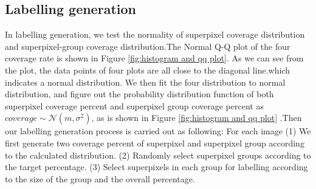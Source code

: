 \documentclass[runningheads,a4paper]{llncs}
\begin{document}
%
%


\subsection{Labelling generation}

In labelling generation, we test the normality of superpixel coverage distribution and superpixel-group coverage distribution.The Normal Q-Q plot of the four coverage rate is shown in Figure \ref{fig:histogram and qq plot}. As we can see from the plot, the data points of four plots are all close to the diagonal line.which indicates a normal distribution. We then fit the four distribution to normal distribution, and figure out the probability distribution function of both superpixel coverage percent and superpixel group coverage percent as $coverage \sim \mathcal{N} (m,\sigma^2)$, as is shown in Figure \ref{fig:histogram and qq plot} .Then our labelling generation process is carried out as following: For each image (1) We first generate two coverage percent of superpixel and superpixel group according to the calculated  distribution. (2) Randomly select superpixel groups according to the target percentage. (3) Select superpixels in each group for labelling according to the size of the group and the overall percentage.
\end{document}
